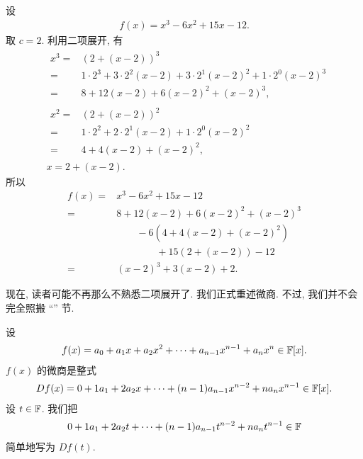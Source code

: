 \begin{example}
    设
    \begin{align*}
        f(x) = x^3 - 6x^2 + 15x - 12.
    \end{align*}
    取 $c = 2$. 利用二项展开, 有
    \begin{align*}
         & \begin{aligned}
            x^3
            = {} & (2 + (x - 2))^3                                                             \\
            = {} & 1 \cdot 2^3 + 3 \cdot 2^2 (x-2) + 3 \cdot 2^1 (x-2)^2 + 1 \cdot 2^0 (x-2)^3 \\
            = {} & 8 + 12(x-2) + 6(x-2)^2 + (x-2)^3,
        \end{aligned} \\
         & \begin{aligned}
            x^2
            = {} & (2 + (x - 2))^2                                       \\
            = {} & 1 \cdot 2^2 + 2 \cdot 2^1 (x-2) + 1 \cdot 2^0 (x-2)^2 \\
            = {} & 4 + 4(x-2) + (x-2)^2,
        \end{aligned} \\
         & x = 2 + (x-2).
    \end{align*}
    所以
    \begin{align*}
        f(x)
        = {} & x^3 - 6x^2 + 15x - 12              \\
        = {} & 8 + 12(x-2) + 6(x-2)^2 + (x-2)^3   \\
             & \qquad - 6(4 + 4(x-2) + (x-2)^2)   \\
             & \qquad \qquad + 15(2 + (x-2)) - 12 \\
        = {} & (x-2)^3 + 3(x-2) + 2.
    \end{align*}
\end{example}

现在, 读者可能不再那么不熟悉二项展开了. 我们正式重述微商. 不过, 我们并不会完全照搬 ``\Derivatives'' 节.

\begin{definition}
    设
    \begin{align*}
        f(x) = a_0 + a_1 x + a_2 x^2 + \cdots + a_{n-1} x^{n-1} + a_n x^n \in \mathbb{F}[x].
    \end{align*}
    $f(x)$ 的微商是整式
    \begin{align*}
        Df(x) = 0 + 1a_1 + 2a_2 x + \cdots + (n-1)a_{n-1} x^{n-2} + na_n x^{n-1} \in \mathbb{F}[x].
    \end{align*}
    设 $t \in \mathbb{F}$. 我们把
    \begin{align*}
        0 + 1a_1 + 2a_2 t + \cdots + (n-1)a_{n-1} t^{n-2} + na_n t^{n-1} \in \mathbb{F}
    \end{align*}
    简单地写为 $Df(t)$.
\end{definition}

